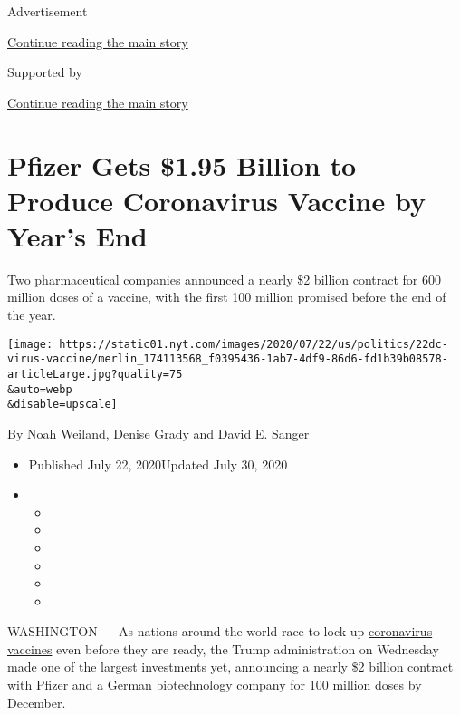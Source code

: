 Advertisement

\protect\hyperlink{after-top}{Continue reading the main story}

Supported by

\protect\hyperlink{after-sponsor}{Continue reading the main story}

\hypertarget{pfizer-gets-195-billion-to-produce-coronavirus-vaccine-by-years-end}{%
\section{Pfizer Gets \$1.95 Billion to Produce Coronavirus Vaccine by
Year's
End}\label{pfizer-gets-195-billion-to-produce-coronavirus-vaccine-by-years-end}}

Two pharmaceutical companies announced a nearly \$2 billion contract for
600 million doses of a vaccine, with the first 100 million promised
before the end of the year.

\texttt{[image: https://static01.nyt.com/images/2020/07/22/us/politics/22dc-virus-vaccine/merlin\_174113568\_f0395436-1ab7-4df9-86d6-fd1b39b08578-articleLarge.jpg?quality=75\\\&auto=webp\\\&disable=upscale]}

By \href{https://www.nytimes.com/by/noah-weiland}{Noah Weiland},
\href{https://www.nytimes.com/by/denise-grady}{Denise Grady} and
\href{https://www.nytimes.com/by/david-e-sanger}{David E. Sanger}

\begin{itemize}
\item
  Published July 22, 2020Updated July 30, 2020
\item
  \begin{itemize}
  \item
  \item
  \item
  \item
  \item
  \item
  \end{itemize}
\end{itemize}

WASHINGTON --- As nations around the world race to lock up
\href{https://www.nytimes.com/2020/07/27/health/moderna-vaccine-covid.html}{coronavirus
vaccines} even before they are ready, the Trump administration on
Wednesday made one of the largest investments yet, announcing a nearly
\$2 billion contract with
\href{https://www.nytimes.com/2020/07/27/health/moderna-vaccine-covid.html}{Pfizer}
and a German biotechnology company for 100 million doses by December.

